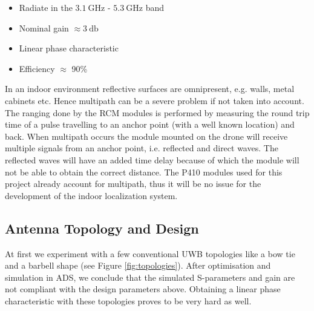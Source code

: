 \documentclass[a4paper]{article}        %
\begin{document}
	\begin{itemize}
		\item Radiate in the $\SI{3.1}{\giga\hertz}$ - $\SI{5.3}{\giga\hertz}$ band
		\item Nominal gain $\approx \SI{3}{\decibel}$
		\item Linear phase characteristic
		\item Efficiency $\approx$ 90\%	

	\end{itemize}

	In an indoor environment reflective surfaces are omnipresent, e.g. walls, metal cabinets etc. Hence multipath can be a severe problem if not taken into account. The ranging done by the RCM modules is performed by measuring the round trip time of a pulse travelling to an anchor point (with a well known location) and back. When multipath occurs the module mounted on the drone will receive multiple signals from an anchor point, i.e. reflected and direct waves. The reflected waves will have an added time delay because of which the module will not be able to obtain the correct distance. 
	The P410 modules used for this project already account for multipath, thus it will be no issue for the development of the indoor localization system.  

	\subsection{Antenna Topology and Design}
	\label{subsec:ant_design}

	At first we experiment with a few conventional UWB topologies like a bow tie and a barbell shape (see Figure \ref{fig:topologies}). After optimisation and simulation in ADS, we conclude that the simulated S-parameters and gain are not compliant with the design parameters above. Obtaining a linear phase characteristic with these topologies proves to be very hard as well.  
\end{document}
